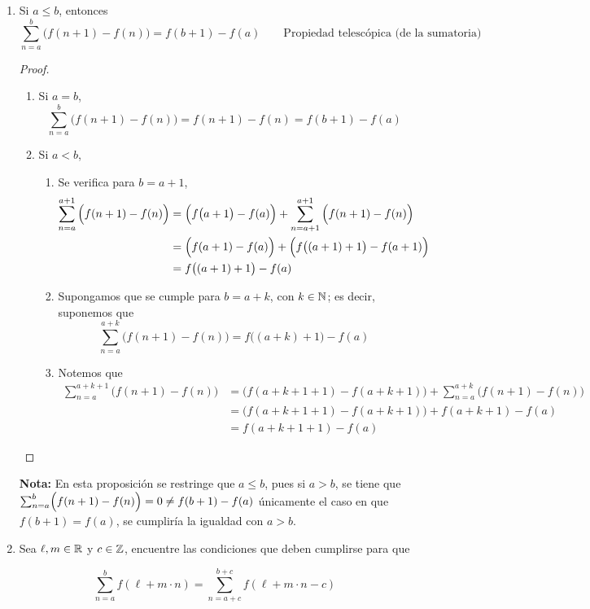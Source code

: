 \begin{enumerate}[label=\alph*)]
  \item Si $a\leq b$, entonces \[\sum_{n=a}^{b} \Big(f(n+1)-f(n)\Big) = f(b+1) - f(a) \qquad \text{Propiedad telescópica (de la sumatoria)}\]
  \begin{proof}\leavevmode
    \begin{enumerate}[label=\Roman*)]
      \item Si $a=b$, \[\sum_{n=a}^{b} \Big(f(n+1)-f(n)\Big) = f(n+1) - f(n) = f(b+1) - f(a)\]
      \item Si $a<b$,
      \begin{enumerate}[label=\roman*)]
        \item Se verifica para $b=a+1$,
        \begin{align*}
          \sum_{n=a}^{a+1} \Big(f(n+1)-f(n)\Big) &= \Bigl(f\big(a+1\big)-f(a)\Bigr) + \sum_{n=a+1}^{a+1} \Big(f(n+1)-f(n)\Big)\\
          &= \Bigl(f(a+1)-f(a)\Bigr) + \Bigl(f\big((a+1)+1\big)-f(a+1)\Bigr)\\
          &= f\bigl((a+1)+1\bigr) - f(a)
        \end{align*}
        \item Supongamos que se cumple para $b=a+k$, con $k\in \mathbb{N}$; es decir, suponemos que
        \[\sum_{n=a}^{a+k} \Big(f(n+1)-f(n)\Big) = f\bigl((a+k)+1\bigr) - f(a)\]
        \item Notemos que
        \begin{align*}
          \sum_{n=a}^{a+k+1} \Big(f(n+1)-f(n)\Big) &= \Big(f(a+k+1+1)-f(a+k+1)\Big) + \sum_{n=a}^{a+k} \Big(f(n+1)-f(n)\Big)\\
          &= \Big(f(a+k+1+1)-f(a+k+1)\Big) + f(a+k+1) - f(a)\\
          &= f(a+k+1+1) - f(a)
        \end{align*}
      \end{enumerate}
    \end{enumerate}
  \end{proof}
  \textbf{Nota:} En esta proposición se restringe que $a\leq b$, pues si $a>b$, se tiene que $\sum_{n=a}^{b} \Bigl(f(n+1)-f(n)\Bigr) = 0 \neq f(b+1) - f(a)$ únicamente el caso en que $f(b+1)=f(a)$, se cumpliría la igualdad con $a>b$.

  \item Sea $\ell, m\in \mathbb{R}$ y $c\in \mathbb{Z}$, encuentre las condiciones que deben cumplirse para que
  
  \[\sum_{n=a}^b f(\ell+m\cdot n) = \sum_{n=a+c}^{b+c} f(\ell+m\cdot n-c)\]


\end{enumerate}
